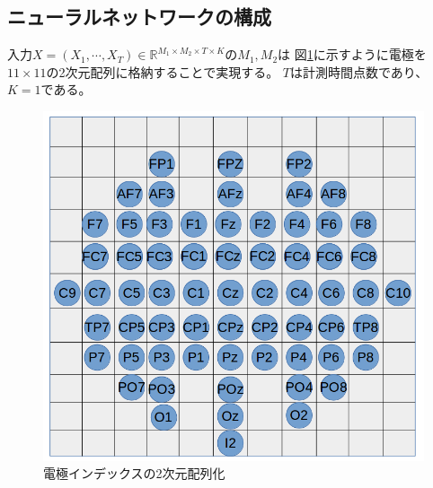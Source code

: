 \subsection{\mc ニューラルネットワークの構成}
入力\(X = (X_1,\cdots,X_T)\in \mathbb R^{M_1 \times M_2 \times T \times K}\)の\(M_1,M_2\)は
図\ref{fig:electo2}に示すように電極を\(11\times 11\)の2次元配列に格納することで実現する。
\(T\)は計測時間点数であり、\(K=1\)である。
\begin{figure}
    \centering
    \includegraphics[width=13cm]{images/denkyokuhaiti.png}
    \caption{電極インデックスの2次元配列化}
    \label{fig:electo2}
\end{figure}

